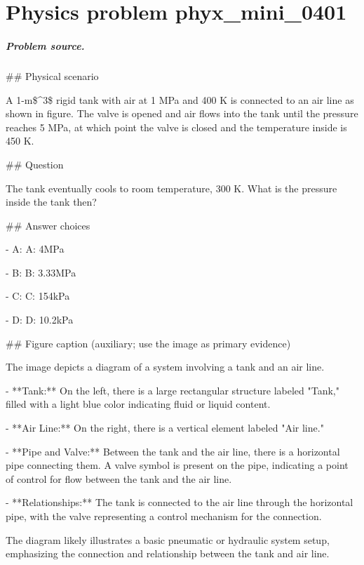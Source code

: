 
\chapter{Physics problem phyx\_mini\_0401}
\label{ch:PhyXMiniProblems_problem_phyx_mini_0401}

\paragraph{Problem source.}
\#\# Physical scenario

A 1-m\$\textasciicircum{}3\$ rigid tank with air at 1 MPa and 400 K is connected to an air line as shown in figure. The valve is opened and air flows into the tank until the pressure reaches 5 MPa, at which point the valve is closed and the temperature inside is 450 K.

\#\# Question

The tank eventually cools to room temperature, 300 K. What is the pressure inside the tank then?

\#\# Answer choices

- A: A: 4MPa

- B: B: 3.33MPa

- C: C: 154kPa

- D: D: 10.2kPa

\#\# Figure caption (auxiliary; use the image as primary evidence)

The image depicts a diagram of a system involving a tank and an air line. 

- **Tank:** On the left, there is a large rectangular structure labeled "Tank," filled with a light blue color indicating fluid or liquid content.
  
- **Air Line:** On the right, there is a vertical element labeled "Air line." 

- **Pipe and Valve:** Between the tank and the air line, there is a horizontal pipe connecting them. A valve symbol is present on the pipe, indicating a point of control for flow between the tank and the air line.

- **Relationships:** The tank is connected to the air line through the horizontal pipe, with the valve representing a control mechanism for the connection. 

The diagram likely illustrates a basic pneumatic or hydraulic system setup, emphasizing the connection and relationship between the tank and air line.

